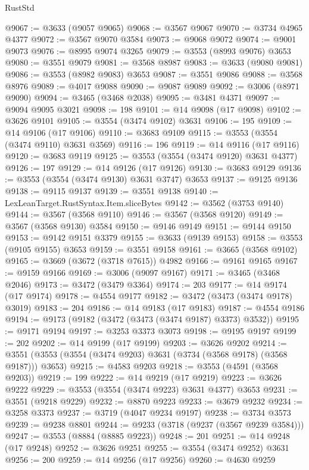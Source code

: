 \begin{lexlean}{RustStd}
\begin{coremodule}
@9067 := @3633 (@9057 @9065)
@9068 := @3567 @9067
@9070 := @3734 @4965 @4377
@9072 := @3567 @9070 @3584
@9073 := @9068 @9072
@9074 := @9001 @9073
@9076 := @8995 @9074 @3265
@9079 := @3553 (@8993 @9076) @3653
@9080 := @3551 @9079
@9081 := @3568 @8987
@9083 := @3633 (@9080 @9081)
@9086 := @3553 (@8982 @9083) @3653
@9087 := @3551 @9086
@9088 := @3568 @8976
@9089 := @4017 @9088
@9090 := @9087 @9089
@9092 := @3006 (@8971 @9090)
@9094 := @3465 (@3468 @2038)
@9095 := @3481 @4371
@9097 := @9094 @9095 @3021
@9098 := 198
@9101 := @14 @9098 (@17 @9098)
@9102 := @3626 @9101
@9105 := @3554 (@3474 @9102) @3631
@9106 := 195
@9109 := @14 @9106 (@17 @9106)
@9110 := @3683 @9109
@9115 := @3553 (@3554 (@3474 @9110) @3631 @3569)
@9116 := 196
@9119 := @14 @9116 (@17 @9116)
@9120 := @3683 @9119
@9125 := @3553 (@3554 (@3474 @9120) @3631 @4377)
@9126 := 197
@9129 := @14 @9126 (@17 @9126)
@9130 := @3683 @9129
@9136 := @3553 (@3554 (@3474 @9130) @3631 @3747) @3653
@9137 := @9125 @9136
@9138 := @9115 @9137
@9139 := @3551 @9138
@9140 := LexLeanTarget.RustSyntax.Item.sliceBytes
@9142 := @3562 (@3753 @9140)
@9144 := @3567 (@3568 @9110)
@9146 := @3567 (@3568 @9120)
@9149 := @3567 (@3568 @9130) @3584
@9150 := @9146 @9149
@9151 := @9144 @9150
@9153 := @9142 @9151 @3379
@9155 := @3633 (@9139 @9153)
@9158 := @3553 (@9105 @9155) @3653
@9159 := @3551 @9158
@9161 := @3665 (@3568 @9102)
@9165 := @3669 (@3672 (@3718 @7615)) @4982
@9166 := @9161 @9165
@9167 := @9159 @9166
@9169 := @3006 (@9097 @9167)
@9171 := @3465 (@3468 @2046)
@9173 := @3472 (@3479 @3364)
@9174 := 203
@9177 := @14 @9174 (@17 @9174)
@9178 := @4554 @9177
@9182 := @3472 (@3473 (@3474 @9178) @3019)
@9183 := 204
@9186 := @14 @9183 (@17 @9183)
@9187 := @4554 @9186
@9194 := @9173 (@9182 (@3472 (@3473 (@3474 @9187) @3373) @3532))
@9195 := @9171 @9194
@9197 := @3253 @3373 @3073
@9198 := @9195 @9197
@9199 := 202
@9202 := @14 @9199 (@17 @9199)
@9203 := @3626 @9202
@9214 := @3551 (@3553 (@3554 (@3474 @9203) @3631 (@3734 (@3568 @9178) (@3568 @9187))) @3653)
@9215 := @4583 @9203
@9218 := @3553 (@4591 (@3568 @9203))
@9219 := 199
@9222 := @14 @9219 (@17 @9219)
@9223 := @3626 @9222
@9229 := @3553 (@3554 (@3474 @9223) @3631 @4377) @3653
@9231 := @3551 (@9218 @9229)
@9232 := @8870 @9223
@9233 := @3679 @9232
@9234 := @3258 @3373
@9237 := @3719 (@4047 @9234 @9197)
@9238 := @3734 @3573
@9239 := @9238 @8801
@9244 := @9233 (@3718 (@9237 (@3567 @9239 @3584)))
@9247 := @3553 (@8884 (@8885 @9223))
@9248 := 201
@9251 := @14 @9248 (@17 @9248)
@9252 := @3626 @9251
@9255 := @3554 (@3474 @9252) @3631
@9256 := 200
@9259 := @14 @9256 (@17 @9256)
@9260 := @4630 @9259

\end{coremodule}
\end{lexlean}

